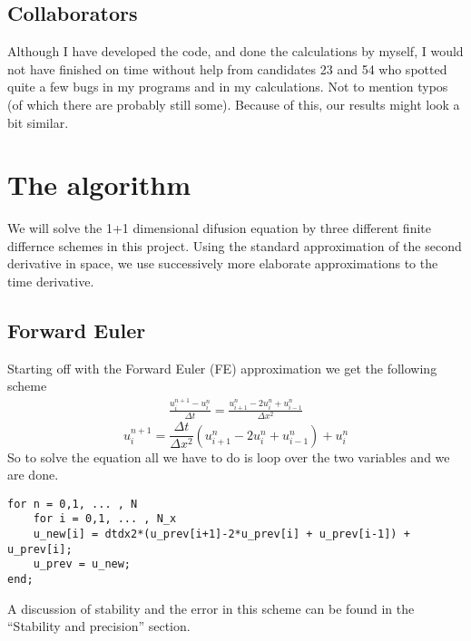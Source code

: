 \documentclass[a4paper,english, 10pt, twoside]{article}
\begin{document}
\subsection{Collaborators}
Although I have developed the code, and done the calculations by myself, I would not have finished on time without help from candidates 
23 and 54 who spotted quite a few bugs in my programs and in my calculations. Not to mention typos (of which there are probably still some). 
Because of this, our results might look a bit similar.
\section{The algorithm}\label{numerical}
We will solve the 1+1 dimensional difusion equation by three different finite differnce schemes in this project. Using the 
standard approximation of the second derivative in space, we use successively more elaborate approximations to the time derivative. 
\subsection{Forward Euler}
Starting off with the Forward Euler (FE) approximation we get the following scheme
\begin{align*}
 \frac{u^{n+1}_i-u^n_i}{\Delta t} = \frac{u^n_{i+1}-2u^n_i + u^n_{i-1}}{\Delta x^2}
\end{align*}
\begin{equation}\label{FE}
 u^{n+1}_i = \frac{\Delta t}{\Delta x^2}\left(u^n_{i+1}-2u^n_i + u^n_{i-1}\right) +u^n_i
\end{equation}
So to solve the equation all we have to do is loop over the two variables and we are done.\\
\begin{lstlisting}
for n = 0,1, ... , N
    for i = 0,1, ... , N_x
	u_new[i] = dtdx2*(u_prev[i+1]-2*u_prev[i] + u_prev[i-1]) + u_prev[i];
    u_prev = u_new;
end;
\end{lstlisting}

A discussion of stability and the error in this scheme can be found in the ``Stability and precision'' section.
\end{document}
